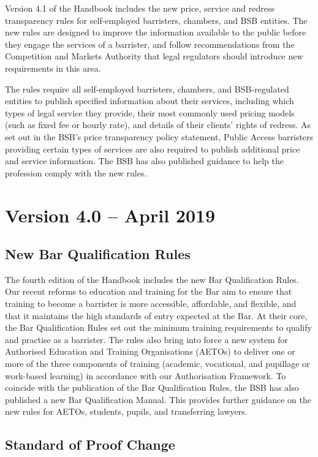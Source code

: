 Version 4.1 of the Handbook includes the new price, service and redress transparency rules for self-employed barristers, chambers, and BSB entities. The new rules are designed to improve the information available to the public before they engage the services of a barrister, and follow recommendations from the Competition and Markets Authority that legal regulators should introduce new requirements in this area. 

The rules require all self-employed barristers, chambers, and BSB-regulated entities to publish specified information about their services, including which types of legal service they provide, their most commonly used pricing models (such as fixed fee or hourly rate), and details of their clients' rights of redress. As set out in the BSB's price transparency policy statement, Public Access barristers providing certain types of services are also required to publish additional price and service information. The BSB has also published guidance to help the profession comply with the new rules.


\section*{Version 4.0 – April 2019}
\subsection*{New Bar Qualification Rules}

The fourth edition of the Handbook includes the new Bar Qualification Rules. Our recent reforms to education and training for the Bar aim to ensure that training to become a barrister is more accessible, affordable, and flexible, and that it maintains the high standards of entry expected at the Bar. At their core, the Bar Qualification Rules set out the minimum training requirements to qualify and practise as a barrister. The rules also bring into force a new system for Authorised Education and Training Organisations (AETOs) to deliver one or more of the three components of training (academic, vocational, and pupillage or work-based learning) in accordance with our Authorisation Framework. To coincide with the publication of the Bar Qualification Rules, the BSB has also published a new Bar Qualification Manual. This provides further guidance on the new rules for AETOs, students, pupils, and transferring lawyers.

\subsection*{Standard of Proof Change}

